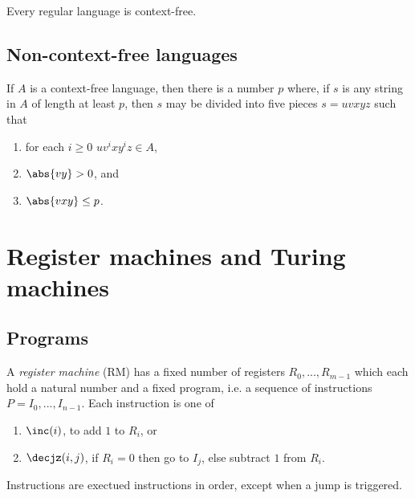 \documentclass{article}
\begin{document}
\begin{corollary*}[Sipser p. 124]
	Every regular language is context-free.
\end{corollary*}

\subsection{Non-context-free languages}

\begin{theorem*}
	If $A$ is a context-free language, then there is a number $p$ where,
	if $s$ is any string in $A$ of length at least $p$, then $s$ may be
	divided into five pieces $s=uvxyz$ such that
	\begin{enumerate}
		\item for each $i\geq 0$ $uv^ixy^iz\in A$,
		\item $\abs{vy}>0$, and
		\item $\abs{vxy}\leq p$.
	\end{enumerate}
\end{theorem*}

\section{Register machines and Turing machines}

\subsection{Programs}

\begin{definition*}[RM]
	A \emph{register machine} (RM) has a fixed number of registers $R_0,...,R_{m-1}$
	which each hold a natural number and a fixed program, i.e. a sequence of
	instructions $P=I_0,...,I_{n-1}$. Each instruction is one of
	\begin{enumerate}
		\item $\inc(i)$, to add $1$ to $R_i$, or
		\item $\decjz(i,j)$, if $R_i=0$ then go to $I_j$, else subtract $1$ from $R_i$.
	\end{enumerate}
	Instructions are exectued instructions in order, except when
	a jump is triggered.
\end{definition*}
\end{document}
